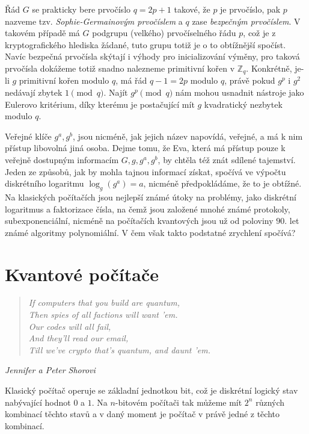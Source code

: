 \documentclass[12pt]{report}
\begin{document}
Řád $G$ se prakticky bere prvočíslo $q = 2p+1$ takové, že $p$ je prvočíslo, pak $p$ nazveme tzv. \textit{Sophie-Germainovým prvočíslem} a $q$ zase \textit{bezpečným prvočíslem}. V takovém případě má $G$ podgrupu (velkého) prvočíselného řádu $p$, což je z kryptografického hlediska žádané, tuto grupu totiž je o to obtížnější spočíst. Navíc bezpečná prvočísla skýtají i výhody pro inicializování výměny, pro taková prvočísla dokážeme totiž snadno nalezneme primitivní kořen v $\mathbb{Z}_q$. Konkrétně, je-li $g$ primitivní kořen modulo $q$, má řád $q-1 = 2p$ modulo $q$, právě pokud $g^{p}$ i $g^2$ nedávají zbytek $1 \pmod{q}$. Najít $g^{p} \pmod{q}$ nám mohou usnadnit nástroje jako Eulerovo kritérium, díky kterému je postačující mít $g$ kvadratický nezbytek modulo $q$.

Veřejné klíče $g^a,g^b$, jsou nicméně, jak jejich název napovídá, veřejné, a má k nim přístup libovolná jiná osoba. Dejme tomu, že Eva, která má přístup pouze k veřejně dostupným informacím $G,g,g^a,g^b$, by chtěla též znát sdílené tajemství. Jeden ze způsobů, jak by mohla tajnou informací získat, spočívá ve výpočtu diskrétního logaritmu $\log_g(g^a) = a$, nicméně předpokládáme, že to je obtížné. Na klasických počítačích jsou nejlepší známé útoky na problémy, jako diskrétní logaritmus a faktorizace čísla, na čemž jsou založené mnohé známé protokoly, subexponenciální, nicméně na počítačích kvantových jsou už od poloviny $90$. let známé algoritmy polynomiální. V čem však takto podstatné zrychlení spočívá?


\section{Kvantové počítače}

\begin{center}
\begin{verse}
\qquad \textit{If computers that you build are quantum,}\\
\qquad \textit{Then spies of all factions will want 'em.}\\
\qquad \textit{Our codes will all fail,}\\
\qquad \textit{And they'll read our email,}\\
\qquad \textit{Till we've crypto that's quantum, and daunt 'em. }
\end{verse}
\hfill \textit{Jennifer a Peter Shorovi}
\end{center}

Klasický počítač operuje se základní jednotkou bit, což je diskrétní logický stav nabývající hodnot $0$ a $1$. Na $n$-bitovém počítači tak můžeme mít $2^n$ různých kombinací těchto stavů a v daný moment je počítač v právě jedné z těchto kombinací.
\end{document}
